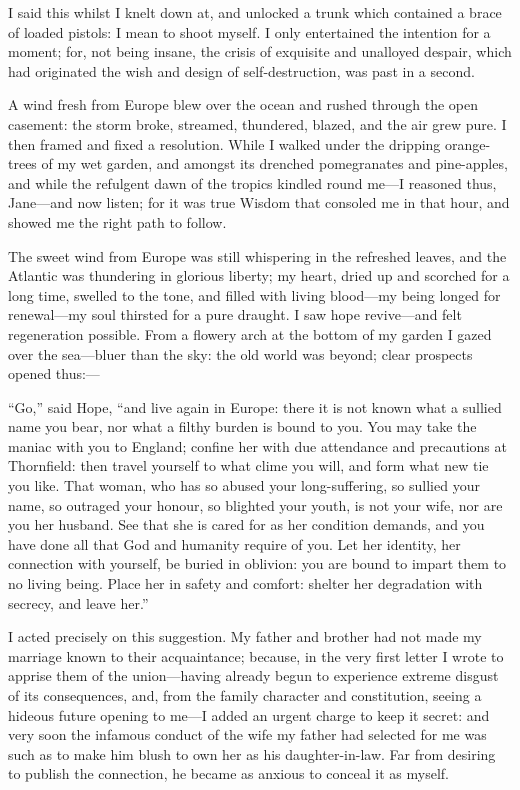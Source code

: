 {	%
	I said this whilst I knelt down at, and unlocked a trunk which
	contained a brace of loaded pistols: I mean to shoot myself. I only
	entertained the intention for a moment; for, not being insane, the
	crisis of exquisite and unalloyed despair, which had originated the wish
	and design of self-destruction, was past in a second.

	A wind fresh from Europe blew over the ocean and rushed through the
	open casement: the storm broke, streamed, thundered, blazed, and the air
	grew pure. I then framed and fixed a resolution. While I walked under
	the dripping orange-trees of my wet garden, and amongst its drenched
	pomegranates and pine-apples, and while the refulgent dawn of the
	tropics kindled round me---I reasoned thus, Jane---and now listen; for
	it was true Wisdom that consoled me in that hour, and showed me the
	right path to follow.

	The sweet wind from Europe was still whispering in the refreshed
	leaves, and the Atlantic was thundering in glorious liberty; my heart,
	dried up and scorched for a long time, swelled to the tone, and filled
	with living blood---my being longed for renewal---my soul thirsted for a
	pure draught. I saw hope revive---and felt regeneration possible. From
	a flowery arch at the bottom of my garden I gazed over the sea---bluer
	than the sky: the old world was beyond; clear prospects opened thus:---

	\enquote{Go,} said Hope, \enquote{and live again in Europe: there it
		is not known what a sullied name you bear, nor what a filthy burden is
		bound to you. You may take the maniac with you to England; confine her
		with due attendance and precautions at Thornfield: then travel yourself
		to what clime you will, and form what new tie you like. That woman, who
		has so abused your long-suffering, so sullied your name, so outraged
		your honour, so blighted your youth, is not your wife, nor are you her
		husband. See that she is cared for as her condition demands, and you
		have done all that God and humanity require of you. Let her identity,
		her connection with yourself, be buried in oblivion: you are bound to
		impart them to no living being. Place her in safety and comfort:
		shelter her degradation with secrecy, and leave her.}

	I acted precisely on this suggestion. My father and brother had not
	made my marriage known to their acquaintance; because, in the very first
	letter I wrote to apprise them of the union---having already begun to
	experience extreme disgust of its consequences, and, from the family
	character and constitution, seeing a hideous future opening to me---I
	added an urgent charge to keep it secret: and very soon the infamous
	conduct of the wife my father had selected for me was such as to make
	him blush to own her as his daughter-in-law. Far from desiring to
	publish the connection, he became as anxious to conceal it as myself.

}
